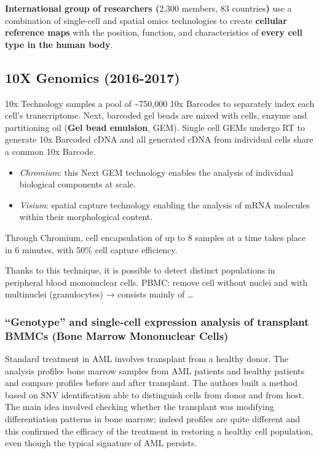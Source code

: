 \textbf{International group of researchers (}2,300 members, 83
countries\textbf{)} use a combination of single-cell and spatial omics
technologies to create \textbf{cellular reference maps} with the
position, function, and characteristics of \textbf{every cell type in
the human body}.

\hypertarget{x-genomics-2016-2017}{%
\subsection{10X Genomics (2016-2017)}\label{x-genomics-2016-2017}}

10x Technology samples a pool of \textasciitilde750,000 10x Barcodes to
separately index each cell's transcriptome. Next, barcoded gel beads are
mixed with cells, enzyme and partitioning oil (\textbf{Gel bead
emulsion}, GEM). Single cell GEMs undergo RT to generate 10x Barcoded
cDNA and all generated cDNA from individual cells share a common 10x
Barcode.

\begin{itemize}
\tightlist
\item
  \emph{Chromium}: this Next GEM technology enables the analysis of
  individual biological components at scale.
\item
  \emph{Visium}: spatial capture technology enabling the analysis of
  mRNA molecules within their morphological content.
\end{itemize}

Through Chromium, cell encapsulation of up to 8 samples at a time takes
place in 6 minutes, with 50\% cell capture efficiency.

Thanks to this technique, it is possible to detect distinct populations
in peripheral blood mononuclear cells. PBMC: remove cell without nuclei
and with multinuclei (granulocytes) → consists mainly of \ldots{}

\hypertarget{genotype-and-single-cell-expression-analysis-of-transplant-bmmcs-bone-marrow-mononuclear-cells}{%
\subsubsection{``Genotype'' and single-cell expression analysis of
transplant BMMCs (Bone Marrow Mononuclear
Cells)}\label{genotype-and-single-cell-expression-analysis-of-transplant-bmmcs-bone-marrow-mononuclear-cells}}

Standard treatment in AML involves transplant from a healthy donor. The
analysis profiles bone marrow samples from AML patients and healthy
patients and compare profiles before and after transplant. The authors
built a method based on SNV identification able to distinguish cells
from donor and from host. The main idea involved checking whether the
transplant was modifying differentiation patterns in bone marrow; indeed
profiles are quite different and this confirmed the efficacy of the
treatment in restoring a healthy cell population, even though the
typical signature of AML persists.

